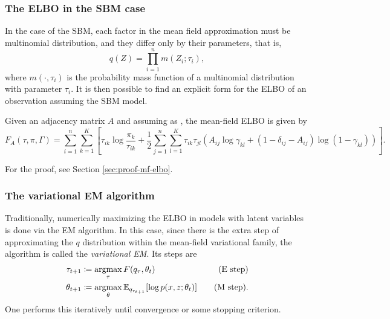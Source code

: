 \documentclass[../../main.tex]{subfiles} %
\begin{document}
\subsubsection{The ELBO in the SBM case}
In the case of the SBM, each factor in the mean field approximation must be 
multinomial distribution, and they differ only by their parameters, that is,
\begin{equation}
	q \left( Z \right) = \prod_{i=1}^n m \left( Z_i; \tau_i \right),
	\label{eq:mean-field-approx}
\end{equation}
where \(m(\cdot, \tau_i)\) is the probability mass function of a multinomial
distribution with parameter \(\tau_i\). It is then possible to find an explicit 
form for the ELBO of an observation assuming the SBM model.

\begin{proposition} \label{prop:mf-elbo}
	Given an adjacency matrix \(A\) and assuming as , the 
	mean-field ELBO is given by
	\begin{dmath}
		F_A (\tau, \pi, \Gamma) = \sum_{i=1}^n \sum_{k=1}^K \left[\tau_{ik}
		\log{\frac{\pi_k}{\tau_{ik}}} + \frac{1}{2} \sum_{j=1}^n \sum_{l=1}^K
		\tau_{ik} \tau_{jl} \left( A_{ij} \log{\gamma_{kl}} + \left( 1 -
		\delta_{ij} - A_{ij}
		\right) \log{\left( 1 - \gamma_{kl} \right)} \right) \right].
		\label{eq:mf-elbo}
	\end{dmath}
\end{proposition}

For the proof, see Section \ref{sec:proof-mf-elbo}.

\subsubsection{The variational EM algorithm}
Traditionally, numerically maximizing the ELBO in models with latent variables 
is done via the EM algorithm. In this case, since there is the extra step of 
approximating the \(q\) distribution within the mean-field variational family, 
the algorithm is called the \textit{variational EM}. Its steps are
\begin{align*}
	\tau_{t+1} &\coloneqq \operatorname*{argmax}_\tau F(q_\tau, \theta_{t}) \quad &\text{(E 
		step)} \\
	\theta_{t+1} &\coloneqq \operatorname*{argmax}_\theta \mathbb E_{q_{\tau_{t+1}}} [\log p 
	(x, z; \theta_{t})] \quad &\text{(M step)}.
\end{align*}
One performs this iteratively until convergence or some stopping 
criterion. 
\end{document}
